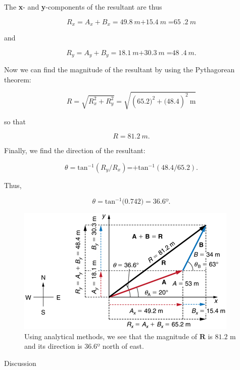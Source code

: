 \documentclass[
]{book}
\newenvironment{tinysection}{}{}
\begin{document}
The \textbf{x}- and \textbf{y}-components of the resultant are thus

\leavevmode\hypertarget{eip-196}{}%
\[{{{R_{x} = {A_{x} + B_{x}}} = \text{49}}\text{.}8\ m{+ \text{15}}\text{.}4\ m{= \text{65}}\text{.}2\ m}{}\]

and

\leavevmode\hypertarget{eip-325}{}%
\[{{{R_{y} = {A_{y} + B_{y}}} = \text{18}}\text{.}1\ m{+ \text{30}}\text{.}3\ m{= \text{48}}\text{.}4\ m\text{.}}{}\]

Now we can find the magnitude of the resultant by using the Pythagorean
theorem:

\leavevmode\hypertarget{eip-941}{}%
\[{{R = \sqrt{R_{x}^{2} + R_{y}^{2}}} = \sqrt{{(\text{65}\text{.}2{)^{2} + (}\text{48}\text{.}4)^{2}}\ \text{m}}}{}\]

so that

\leavevmode\hypertarget{eip-702}{}%
\[R = 81.2\ m.\]

Finally, we find the direction of the resultant:

\leavevmode\hypertarget{eip-713}{}%
\[{{{\theta = \text{tan}^{- 1}}({R_{y}/R_{x}})\text{=+}\text{tan}^{- 1}(\text{48}\text{.}{4/\text{65}}\text{.}2)}\text{.}}{}\]

Thus,

\leavevmode\hypertarget{eip-755}{}%
\[{{\theta = \text{tan}^{- 1}}(0\text{.}\text{742}{) = \text{36}}\text{.}6º\text{.}}{}\]

\begin{figure}
\hypertarget{import-auto-id1165298804108}{%
\centering
\includegraphics{images/Figure_03_03_09a.jpg}
\caption{Using analytical methods, we see that the magnitude of \(\mathbf{R}{}\)
is \({\text{81}\text{.}\text{2\ m}}{}\) and its direction is
\({\text{36}\text{.}6º}{}\) north of
east.}\label{import-auto-id1165298804108}
}
\end{figure}

\begin{tinysection}

{Discussion}

\end{tinysection}
\end{document}
